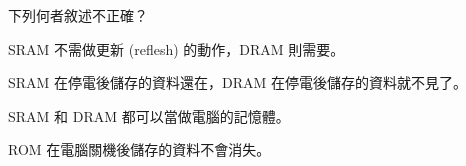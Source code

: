 \ifx\ntpcNinetyThree\undefined[93學年基北區] \fi
下列何者敘述不正確？
  \begin{optionlist}
  \item SRAM 不需做更新 (reflesh) 的動作，DRAM 則需要。
  \item SRAM 在停電後儲存的資料還在，DRAM 在停電後儲存的資料就不見了。\label{ntpc-93-a3}
  \item SRAM 和 DRAM 都可以當做電腦的記憶體。
  \item ROM 在電腦關機後儲存的資料不會消失。
  \end{optionlist}